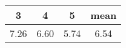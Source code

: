 \begin{tabular}{|c|c|c|c|}
\hline
\textbf{3}&\textbf{4}&\textbf{5}&\textbf{mean}\\\hline
7.26&6.60&5.74&6.54\\\hline
\end{tabular}

